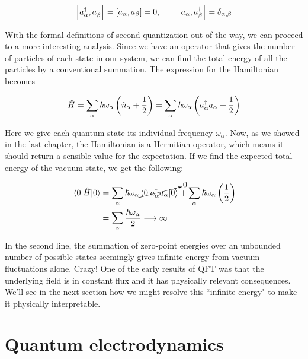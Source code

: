 \begin{equation}
	\left[a^{\dagger}_{\alpha},a^{\dagger}_{\beta}\right] = \left[a_{\alpha},a_{\beta}\right] = 0, \qquad \left[a_{\alpha}, a^{\dagger}_{\beta}\right] = \delta_{\alpha,\beta}
\end{equation}

With the formal definitions of second quantization out of the way, we can proceed to a more interesting analysis. 
Since we have an operator that gives the number of particles of each state in our system, we can find the total energy of all the particles by a conventional summation. 
The expression for the Hamiltonian becomes

\begin{equation}
	\hat{H} = \sum_{\alpha} \hbar\omega_{\alpha} \left(\hat{n}_{\alpha} + \frac{1}{2} \right) = \sum_{\alpha} \hbar\omega_{\alpha} \left(a^{\dagger}_{\alpha}a_{\alpha} + \frac{1}{2}\right)
\end{equation}

Here we give each quantum state its individual frequency $\omega_{\alpha}$. 
Now, as we showed in the last chapter, the Hamiltonian is a Hermitian operator, which means it should return a sensible value for the expectation. 
If we find the expected total energy of the vacuum state, we get the following:

\begin{align*}
	\mel{0}{\hat{H}}{0} &= \sum_{\alpha} \hbar\omega_{\alpha} \cancelto{0}{\mel{0}{a^{\dagger}_{\alpha}a_{\alpha}}{0}} + \sum_{\alpha}\hbar\omega_{\alpha}\left(\frac{1}{2}\right) \\
	&= \sum_{\alpha} \frac{\hbar\omega_{\alpha}}{2} \longrightarrow \infty
\end{align*}

In the second line, the summation of zero-point energies over an unbounded number of possible states seemingly gives infinite energy from vacuum fluctuations alone. 
Crazy! 
One of the early results of QFT was that the underlying field is in constant flux and it has physically relevant consequences. 
We'll see in the next section how we might resolve this ``infinite energy" to make it physically interpretable.


\section{Quantum electrodynamics}


